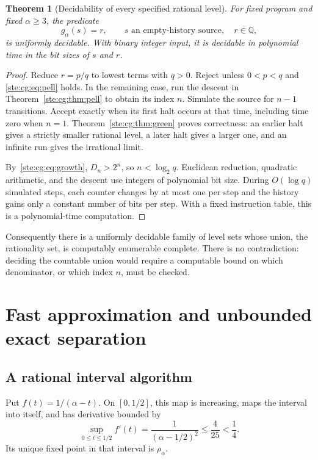 \documentclass[11pt,letterpaper]{article}
\newtheorem{theorem}{Theorem}[section]
\theoremstyle{definition}
\theoremstyle{remark}
\newcommand{\Q}{\mathbb Q}
\begin{document}
\begin{theorem}[Decidability of every specified rational level]\label{ste:cg:thm:level}
For fixed program and fixed $\alpha\ge3$, the predicate
\begin{equation}\label{ste:cg:eq:rationallevel}
 g_\alpha(s)=r,
 \qquad s\text{ an empty-history source},\quad r\in\Q,
\end{equation}
is uniformly decidable. With binary integer input, it is decidable in
polynomial time in the bit sizes of $s$ and $r$.
\end{theorem}
\begin{proof}
Reduce $r=p/q$ to lowest terms with $q>0$. Reject unless $0<p<q$ and
\eqref{ste:cg:eq:pell} holds. In the remaining case, run the descent in
Theorem~\ref{ste:cg:thm:pell} to obtain its index $n$. Simulate the source for
$n-1$ transitions. Accept exactly when its first halt occurs at that time,
including time zero when $n=1$. Theorem~\ref{ste:cg:thm:green} proves correctness:
an earlier halt gives a strictly smaller rational level, a later halt gives
a larger one, and an infinite run gives the irrational limit.

By~\eqref{ste:cg:eq:growth}, $D_n>2^n$, so $n<\log_2 q$. Euclidean reduction,
quadratic arithmetic, and the descent use integers of polynomial bit size.
During $O(\log q)$ simulated steps, each counter changes by at most one
per step and the history gains only a constant number of bits per step.
With a fixed instruction table, this is a polynomial-time computation.
\end{proof}

Consequently there is a uniformly decidable family of level sets whose
union, the rationality set, is computably enumerable complete. There is no
contradiction: deciding the countable union would require a computable
bound on which denominator, or which index $n$, must be checked.

\section{Fast approximation and unbounded exact separation}\label{ste:cg:sec:approximation}
\subsection{A rational interval algorithm}
Put $f(t)=1/(\alpha-t)$. On $[0,1/2]$, this map is increasing, maps the
interval into itself, and has derivative bounded by
\begin{equation}\label{ste:cg:eq:lipschitz}
 \sup_{0\le t\le1/2}f'(t)=\frac1{(\alpha-1/2)^2}\le\frac4{25}<\frac14.
\end{equation}
Its unique fixed point in that interval is $\rho_\alpha$.
\end{document}

